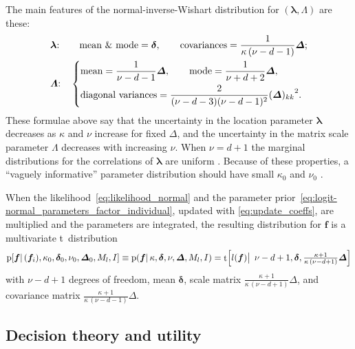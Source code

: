 \documentclass[%
]{frontiersSCNS-nologo} %
\newcommand*{\sect}{\S} %
\newcommand*{\amp}{\&}
\newcommand*{\pf}{\mathrm{p}}%
\renewcommand*{\|}{\mathpunct{|}}%
\newcommand*{\bigcond}{\mathpunct{\big|\ }}%
\newcommand*{\yxx}{f}
\newcommand*{\yx}{\bm{\yxx}}
\newcommand*{\ylm}{\lambda}
\newcommand*{\ylmm}{\bm{\ylm}}
\newcommand*{\yls}{\varLambda}
\newcommand*{\ylss}{\bm{\yls}}
\newcommand*{\yd}{d}
\newcommand*{\yI}{I}
\newcommand*{\yM}{M}
\newcommand*{\yMl}{\yM_l}
\newcommand*{\ytr}{l}
\DeclareMathOperator{\dstudentt}{t}
\newcommand*{\ymu}{\bm{\delta}}
\newcommand*{\yka}{\kappa}
\newcommand*{\ynu}{\nu}
\newcommand*{\yLa}{\bm{\varDelta}}
\newcommand*{\ymuo}{\ymu_0}
\newcommand*{\ykao}{\yka_0}
\newcommand*{\ynuo}{\ynu_0}
\newcommand*{\yLao}{\yLa_0}
\begin{document}
The main features of the normal-inverse-Wishart distribution for
$(\ylmm, \ylss)$ are these:
\begin{equation}
  \label{eq:moments_modes_norm-iwishart}
  \begin{aligned}
    &\text{$\ylmm$:}\quad\;\hphantom{\Biggl\{}\text{mean \amp\ mode} = \ymu,
      \qquad\text{covariances} = \frac{1}{\yka\,(\ynu-\yd-1)}\yLa;\\
    &\text{$\ylss$:}\quad\left\{ 
      \!\begin{aligned}
          &\text{mean} = \frac{1}{\ynu-\yd-1}\yLa,
            \qquad\text{mode} = \frac{1}{\ynu+\yd+2}\yLa,\\
          &\text{diagonal variances} =
            \frac{2}{(\ynu-\yd-3)(\ynu-\yd-1)^2}{(\yLa)_{kk}}^2.
      \end{aligned}\right.
  \end{aligned}
\end{equation}
These formulae above say that the uncertainty in the location parameter
$\ylmm$ decreases as $\yka$ and $\ynu$ increase for fixed $\yLa$, and the
uncertainty in the matrix scale parameter $\ylss$ decreases with increasing
$\ynu$. When $\ynu=\yd+1$ the marginal distributions for the correlations
of $\ylmm$ are uniform \citetext{\citealp[\sect~3.6]{gelmanetal1995_r2014};
  \citealp[\sect~2.2]{barnardetal2000}}. Because of these properties, a
\enquote{vaguely informative} parameter distribution should have small
$\ykao$ and $\ynuo$ 
\citep{minka1998_r2001,murphy2007}.



When the likelihood~\eqref{eq:likelihood_normal} and the parameter
prior~\eqref{eq:logit-normal_parameters_factor_individual}, updated with
\eqref{eq:update_coeffs}, are multiplied and the parameters are integrated,
the resulting distribution for $\yx$ is a multivariate t~distribution
\citep{kotzetal2004,minka1998_r2001,murphy2007}
\begin{equation}
  \label{eq:predictive_distribution}
  \pf[\yx \| (\yx_i),\ykao,\ymuo,\ynuo,\yLao,\yMl, \yI] \equiv
  \pf(\yx \| \yka,\ymu,\ynu,\yLa,\yMl, \yI) =
  \dstudentt\Bigl[\ytr(\yx) \bigcond \ynu-\yd+1, \ymu,
  \tfrac{\yka+1}{\yka\,(\ynu-\yd+1)}\yLa \Bigr]
\end{equation}
with $\ynu-\yd+1$ degrees of freedom, mean $\ymu$, scale matrix
$\frac{\yka+1}{\yka\,(\ynu-\yd+1)}\yLa$, and covariance matrix
$\frac{\yka+1}{\yka\,(\ynu-\yd-1)}\yLa$.

\subsection{Decision theory  and utility}
\label{sec:decision_theory}
\end{document}
